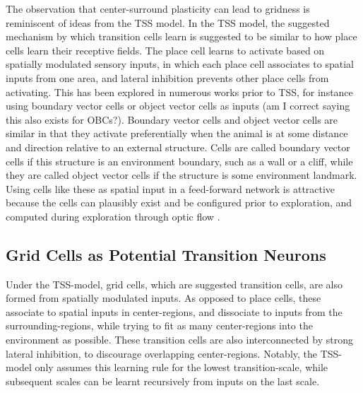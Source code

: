\documentclass{article}
\begin{document}
    The observation that center-surround plasticity can lead to gridness is reminiscent of ideas from the TSS model. In the TSS model, the suggested mechanism by which transition cells learn is suggested to be similar to how place cells learn their receptive fields. The place cell learns to activate based on spatially modulated sensory inputs, in which each place cell associates to spatial inputs from one area, and lateral inhibition prevents other place cells from activating. This has been explored in numerous works prior to TSS, for instance using boundary vector cells or object vector cells as inputs \parencite{Barry2006}(am I correct saying this also exists for OBCs?). Boundary vector cells and object vector cells are similar in that they activate preferentially when the animal is at some distance and direction relative to an external structure. Cells are called boundary vector cells if this structure is an environment boundary, such as a wall or a cliff, while they are called object vector cells if the structure is some environment landmark. Using cells like these as spatial input in a feed-forward network is attractive because the cells can plausibly exist and be configured prior to exploration, and computed during exploration through optic flow \parencite{Raudies2012}.

    \subsection{Grid Cells as Potential Transition Neurons}
    Under the TSS-model, grid cells, which are suggested transition cells, are also formed from spatially modulated inputs. As opposed to place cells, these associate to spatial inputs in center-regions, and dissociate to inputs from the surrounding-regions, while trying to fit as many center-regions into the environment as possible. These transition cells are also interconnected by strong lateral inhibition, to discourage overlapping center-regions.
    Notably, the TSS-model only assumes this learning rule for the lowest transition-scale, while subsequent scales can be learnt recursively from inputs on the last scale.
\end{document}
